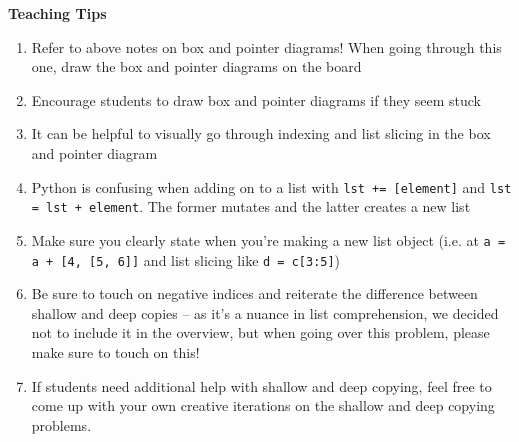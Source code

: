 \begin{questionmeta}
    \textbf{Teaching Tips}
    \begin{enumerate}
            \item Refer to above notes on box and pointer diagrams! When going through this one, draw the box and pointer diagrams on the board
            \item Encourage students to draw box and pointer diagrams if they seem stuck
            \item It can be helpful to visually go through indexing and list slicing in the box and pointer diagram
            \item Python is confusing when adding on to a list with \lstinline{lst += [element]} and \lstinline{lst = lst + element}. The former mutates and the latter creates a new list
            \item Make sure you clearly state when you’re making a new list object (i.e. at \lstinline{a = a + [4, [5, 6]]} and list slicing like \lstinline{d = c[3:5]})
            \item Be sure to touch on negative indices and reiterate the difference between shallow and deep copies -- as it's a nuance in list comprehension, we decided not to include it in the overview, but when going over this problem, please make sure to touch on this!
            \item If students need additional help with shallow and deep copying, feel free to come up with your own creative iterations on the shallow and deep copying problems.
    \end{enumerate}
\end{questionmeta}